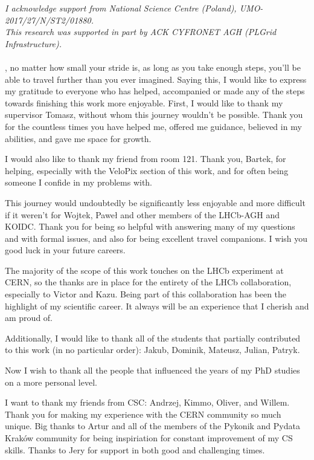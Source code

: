 
\noindent \textit{I acknowledge support from National Science Centre (Poland), UMO-2017/27/N/ST2/01880.}\\
\noindent \textit{This research was supported in part by ACK CYFRONET AGH (PLGrid Infrastructure).}
\\
\\

, no matter how small your stride is, as long as you take enough steps, you’ll be able to travel further than you ever imagined.
Saying this, I would like to express my gratitude to everyone who has helped, accompanied or made any of the steps towards finishing this work more enjoyable.
\bigbreak
First, I would like to thank my supervisor Tomasz, without whom this journey wouldn’t be possible. Thank you for the countless times you have helped me, offered me guidance, believed in my abilities, and gave me space for growth.

I would also like to thank my friend from room 121. Thank you, Bartek, for helping, especially with the VeloPix section of this work, and for often being someone I confide in my problems with.

This journey would undoubtedly be significantly less enjoyable and more difficult if it weren’t for Wojtek, Paweł and other members of the LHCb-AGH and KOIDC. Thank you for being so helpful with answering many of my questions and with formal issues, and also for being excellent travel companions. I wish you good luck in your future careers.

The majority of the scope of this work touches on the LHCb experiment at CERN, so the thanks are in place for the entirety of the LHCb collaboration, especially to Victor and Kazu.
Being part of this collaboration has been the highlight of my scientific career. It always will be an experience that I cherish and am proud of.

Additionally, I would like to thank all of the students that partially contributed to this work (in no particular order): Jakub, Dominik, Mateusz, Julian, Patryk.

\bigbreak
Now I wish to thank all the people that influenced the years of my PhD studies on a more personal level.

I want to thank my friends from CSC: Andrzej, Kimmo, Oliver, and Willem. Thank you for making my experience with the CERN community so much unique.
Big thanks to Artur and all of the members of the Pykonik and Pydata Kraków community for being inspiriation for constant improvement of my CS skills.
Thanks to Jery for support in both good and challenging times.

